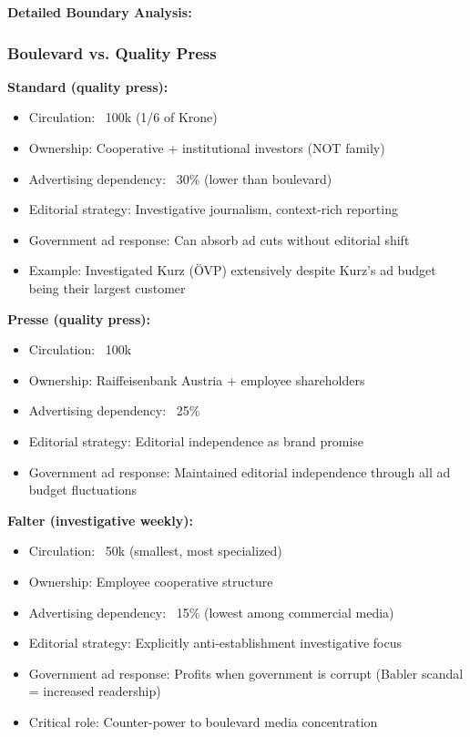 \textbf{Detailed Boundary Analysis:}

\subsubsection*{Boulevard vs. Quality Press}

\textbf{Standard (quality press):}
\begin{itemize}
\item Circulation: ~100k (1/6 of Krone)
\item Ownership: Cooperative + institutional investors (NOT family)
\item Advertising dependency: ~30\% (lower than boulevard)
\item Editorial strategy: Investigative journalism, context-rich reporting
\item Government ad response: Can absorb ad cuts without editorial shift
\item Example: Investigated Kurz (ÖVP) extensively despite Kurz's ad budget being their largest customer
\end{itemize}

\textbf{Presse (quality press):}
\begin{itemize}
\item Circulation: ~100k
\item Ownership: Raiffeisenbank Austria + employee shareholders
\item Advertising dependency: ~25\%
\item Editorial strategy: Editorial independence as brand promise
\item Government ad response: Maintained editorial independence through all ad budget fluctuations
\end{itemize}

\textbf{Falter (investigative weekly):}
\begin{itemize}
\item Circulation: ~50k (smallest, most specialized)
\item Ownership: Employee cooperative structure
\item Advertising dependency: ~15\% (lowest among commercial media)
\item Editorial strategy: Explicitly anti-establishment investigative focus
\item Government ad response: Profits when government is corrupt (Babler scandal = increased readership)
\item Critical role: Counter-power to boulevard media concentration
\end{itemize}

